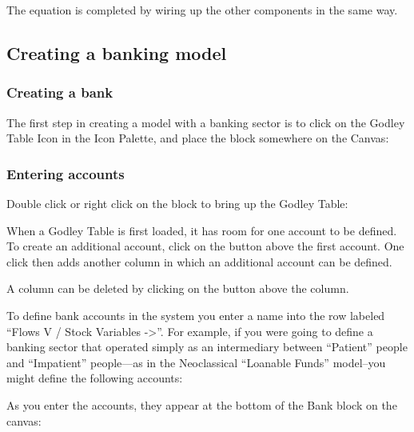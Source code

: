 

The equation is completed by wiring up the other components in the same way.



\subsection{Creating a banking model}
\label{creatingBankingModel}

\subsubsection{Creating a bank}

The first step in creating a model with a banking sector is to click on the Godley Table Icon in the Icon Palette, and place the block somewhere on the Canvas:


\subsubsection{Entering accounts}

Double click or right click on the  block
to bring up the Godley Table:



When a Godley Table is first loaded, it has room for one account to be defined. To create an additional account, click on the  button above the first account. One click then adds another column in which an additional account can be defined.



A column can be deleted by clicking on the  button above the column.

To define bank accounts in the system you enter a name into the row
labeled ``Flows V / Stock Variables ->''. For example, if you were
going to define a banking sector that operated simply as an
intermediary between ``Patient'' people and ``Impatient'' people---as
in the Neoclassical ``Loanable Funds'' model--you might define the
following accounts: 


As you enter the accounts, they appear at the bottom of the Bank block on the canvas:


